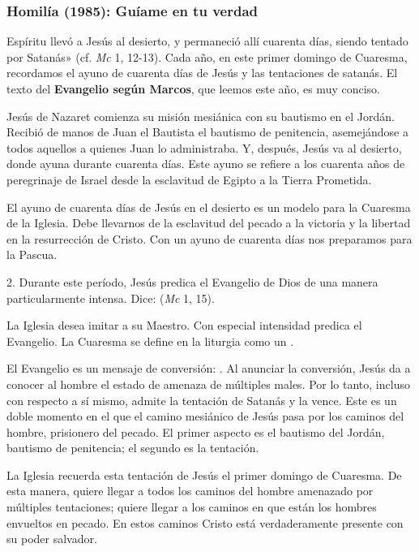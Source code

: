 \subsubsection{Homilía (1985): Guíame en tu verdad}


\begin{body}
 Espíritu llevó a Jesús al desierto, y permaneció allí cuarenta días, siendo tentado por Satanás» (cf. \textit{Mc} 1, 12-13). Cada año, en este primer domingo de Cuaresma, recordamos el ayuno de cuarenta días de Jesús y las tentaciones de satanás. El texto del \textbf{Evangelio según Marcos}, que leemos este año, es muy conciso.

Jesús de Nazaret comienza su misión mesiánica con su bautismo en el Jordán. Recibió de manos de Juan el Bautista el bautismo de penitencia, asemejándose a todos aquellos a quienes Juan lo administraba. Y, después, Jesús va al desierto, donde ayuna durante cuarenta días. Este ayuno se refiere a los cuarenta años de peregrinaje de Israel desde la esclavitud de Egipto a la Tierra Prometida.

El ayuno de cuarenta días de Jesús en el desierto es un modelo para la Cuaresma de la Iglesia. Debe llevarnos de la esclavitud del pecado a la victoria y la libertad en la resurrección de Cristo. Con un ayuno de cuarenta días nos preparamos para la Pascua.

2. Durante este período, Jesús predica el Evangelio de Dios de una manera particularmente intensa. Dice:  (\textit{Mc} 1, 15).

La Iglesia desea imitar a su Maestro. Con especial intensidad predica el Evangelio. La Cuaresma se define en la liturgia como un .

El Evangelio es un mensaje de conversión: . Al anunciar la conversión, Jesús da a conocer al hombre el estado de amenaza de múltiples males. Por lo tanto, incluso con respecto a sí mismo, admite la tentación de Satanás y la vence. Este es un doble momento en el que el camino mesiánico de Jesús pasa por los caminos del hombre, prisionero del pecado. El primer aspecto es el bautismo del Jordán, bautismo de penitencia; el segundo es la tentación.

La Iglesia recuerda esta tentación de Jesús el primer domingo de Cuaresma. De esta manera, quiere llegar a todos los caminos del hombre amenazado por múltiples tentaciones; quiere llegar a los caminos en que están los hombres envueltos en pecado. En estos caminos Cristo está verdaderamente presente con su poder salvador.


\end{body}
